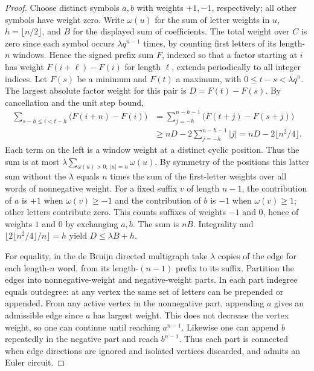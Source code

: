 \documentclass[11pt]{article}
\begin{document}
\begin{proof}
Choose distinct symbols \(a,b\) with weights \(+1,-1\), respectively;
all other symbols have weight zero. Write \(\omega(u)\) for the sum
of letter weights in \(u\), \(h=\lfloor n/2\rfloor\), and \(B\) for
the displayed sum of coefficients. The total weight over \(C\)
is zero since each symbol occurs \(\lambda q^{n-1}\) times, by
counting first letters of its length-\(n\) windows. Hence the
signed prefix sum \(F\), indexed so that a factor starting at \(i\)
has weight \(F(i+\ell)-F(i)\) for length \(\ell\), extends
periodically to all integer indices. Let \(F(s)\) be a minimum
and \(F(t)\) a maximum, with \(0\le t-s<\lambda q^n\). The largest
absolute factor weight for this pair is \(D=F(t)-F(s)\).
By cancellation and the unit step bound,
\begin{align*}
 \sum_{s-h\le i<t-h}\bigl(F(i+n)-F(i)\bigr)
 &=\sum_{j=-h}^{n-h-1}\bigl(F(t+j)-F(s+j)\bigr)\\
 &\ge nD-2\sum_{j=-h}^{n-h-1}|j|
  = nD-2\lfloor n^2/4\rfloor .
\end{align*}
Each term on the left is a window weight at a distinct cyclic
position. Thus the sum is at most
\(\lambda\sum_{\omega(u)>0,\ |u|=n}\omega(u)\).
By symmetry of the positions this latter sum without the
\(\lambda\) equals \(n\) times the sum of the first-letter weights
over all words of nonnegative weight. For a fixed suffix \(v\)
of length \(n-1\), the contribution of \(a\) is \(+1\) when
\(\omega(v)\ge-1\) and the contribution of \(b\) is \(-1\) when
\(\omega(v)\ge1\); other letters contribute zero. This counts
suffixes of weights \(-1\) and \(0\), hence of weights \(1\) and \(0\)
by exchanging \(a,b\). The sum is \(nB\). Integrality and
\(\lfloor 2\lfloor n^2/4\rfloor/n\rfloor=h\) yield
\(D\le\lambda B+h\).

For equality, in the de Bruijn directed multigraph take
\(\lambda\) copies of the edge for each length-\(n\) word, from
its length-\((n-1)\) prefix to its suffix. Partition the edges
into nonnegative-weight and negative-weight parts. In each
part indegree equals outdegree: at any vertex the same set of
letters can be prepended or appended. From any active vertex
in the nonnegative part, appending \(a\) gives an admissible edge
since \(a\) has largest weight. This does not decrease the vertex
weight, so one can continue until reaching \(a^{n-1}\).
Likewise one can append \(b\) repeatedly in the negative part
and reach \(b^{n-1}\). Thus each part is connected when edge
directions are ignored and isolated vertices discarded, and
admits an Euler circuit.


\end{proof}
\end{document}
